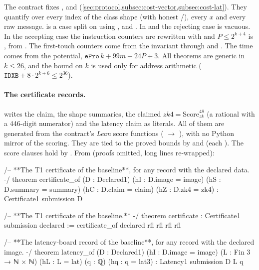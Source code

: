 The contract fixes ,  and 
(\cref{sec:protocol,subsec:cost-vector,subsec:cost-lat}). They quantify over every index of the class
shape (with honest /), every $x$ and every raw message.  is a
case split on  using ,  and . In
 and  the rejecting case is vacuous. In the accepting
case the instruction counters are rewritten with  and $P\le2^{k+4}$ is
, from . The first-touch counters come from the invariant through
 and . The time comes from the potential, $\mathtt{ePro}\,k+99m+24P+3$.
All theorems are generic in $k\le26$, and the bound on $k$ is used only for address arithmetic
($\mathtt{IDXB}+8\cdot2^{k+6}\le2^{36}$).

\paragraph{The certificate records.}  writes the claim, the shape summaries,
the claimed $\mathit{zk4}=\mathrm{Score}_{zk}^{48}$ (a rational with a 446-digit numerator) and the
latency claim as literals. All of them are generated from the contract's \emph{Lean} score functions
( $\to$ ), with no Python mirror of the scoring. They are
tied to the proved bounds by  and
 (each ). The score clauses hold by . From
 (proofs omitted, long lines re-wrapped):

\begin{leancode}
/-- **The T1 certificate of the baseline**, for any record with the declared
data. -/
theorem certificate_of (D : Declared1) (hI : D.image = image) (hS : D.summary = summary)
    (hC : D.claim = claim) (hZ : D.zk4 = zk4) : Certificate1 submission D

/-- **The T1 certificate of the baseline.** -/
theorem certificate : Certificate1 submission declared :=
  certificate_of declared rfl rfl rfl rfl

/-- **The latency-board record of the baseline**, for any record with the declared
image. -/
theorem latency_of (D : Declared1) (hI : D.image = image) (L : Fin 3 → ℕ × ℕ)
    (hL : L = lat) (q : ℚ) (hq : q = lat3) : Latency1 submission D L q
\end{leancode}

